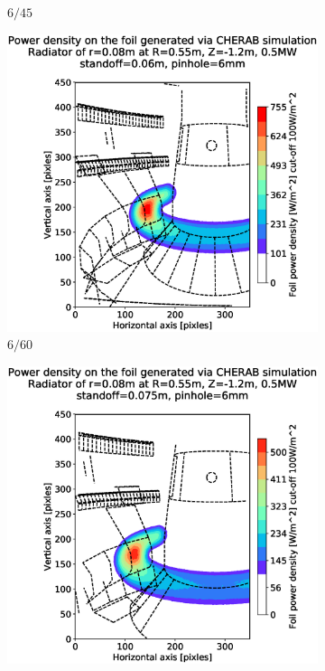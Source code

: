 \begin{figure}
\begin{subfigure}{0.32\textwidth}
         \caption{$6/45$}
         \label{fig:6_45}
     \end{subfigure}
     \hfill
     \begin{subfigure}{0.31\textwidth}
         \centering
         \includegraphics[trim={85 25 57 80},clip,width=\textwidth]{Chapters/chapter2/figs/measured_power_6_60radiator_R0.55_Z-1.2_r0.08.stl.eps}
         \caption{$6/60$}
         \label{fig:6_60}
     \end{subfigure}
     \hfill
     \begin{subfigure}{0.325\textwidth}
         \centering
         \includegraphics[trim={85 25 40 80},clip,width=\textwidth]{Chapters/chapter2/figs/measured_power_6_75radiator_R0.55_Z-1.2_r0.08.stl.eps}

\end{subfigure}
\end{figure}
